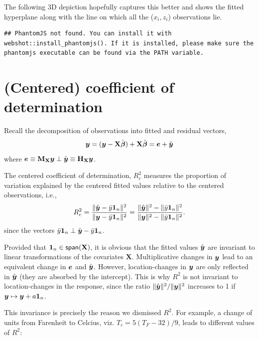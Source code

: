 \documentclass[]{book}
\theoremstyle{definition}
\theoremstyle{definition}
\theoremstyle{definition}
\theoremstyle{remark}
\begin{document}
The following 3D depiction hopefully captures this better and shows the
fitted hyperplane along with the line on which all the (\(x_i, z_i\))
observations lie.

\begin{verbatim}
## PhantomJS not found. You can install it with webshot::install_phantomjs(). If it is installed, please make sure the phantomjs executable can be found via the PATH variable.
\end{verbatim}

\hypertarget{rgl35558}{}

\section{(Centered) coefficient of
determination}\label{centered-coefficient-of-determination}

Recall the decomposition of observations into fitted and residual
vectors,
\[\boldsymbol{y} = (\boldsymbol{y} - \mathbf{X}\hat{\boldsymbol{\beta}}) + \mathbf{X} \hat{\boldsymbol{\beta}} = \boldsymbol{e} + \hat{\boldsymbol{y}}\]
where
\(\boldsymbol{e} \equiv \mathbf{M}_{\mathbf{X}}\boldsymbol{y} \perp \hat{\boldsymbol{y}} \equiv \mathbf{H}_{\mathbf{X}}\boldsymbol{y}\).

The centered coefficient of determination, \(R^2_c\) measures the
proportion of variation explained by the centered fitted values relative
to the centered observations, i.e.,
\[ R^2_c = \frac{\|\hat{\boldsymbol{y}}-\bar{y}\mathbf{1}_n\|^2}{\|\boldsymbol{y}-\bar{y}\mathbf{1}_n\|^2}=\frac{\|\hat{\boldsymbol{y}}\|^2-\|\bar{y}\mathbf{1}_n\|^2}{\|\boldsymbol{y}\|^2-\|\bar{y}\mathbf{1}_n\|^2}.\]
since the vectors
\(\bar{y}\mathbf{1}_n \perp \hat{\boldsymbol{y}}-\bar{y}\mathbf{1}_n\).

Provided that \(\mathbf{1}_n \in \mathsf{span}(\mathbf{X})\), it is obvious that the
fitted values \(\hat{\boldsymbol{y}}\) are invariant to linear transformations
of the covariates \(\mathbf{X}\). Multiplicative changes in \(\boldsymbol{y}\)
lead to an equivalent change in \(\boldsymbol{e}\) and \(\hat{\boldsymbol{y}}\).
However, location-changes in \(\boldsymbol{y}\) are only reflected in
\(\hat{\boldsymbol{y}}\) (they are absorbed by the intercept). This is why
\(R^2\) is not invariant to location-changes in the response, since the
ratio \(\|\hat{\boldsymbol{y}}\|^2/\|\boldsymbol{y}\|^2\) increases to 1 if
\({\boldsymbol{y}} \mapsto {\boldsymbol{y}} + a \mathbf{1}_n\).

This invariance is precisely the reason we dismissed \(R^2\). For
example, a change of units from Farenheit to Celcius, viz.
\(T_c = 5 (T_F - 32)/9\), leads to different values of \(R^2\):
\end{document}
